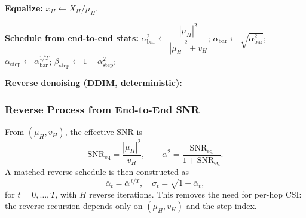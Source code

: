 \documentclass[journal]{IEEEtran}
\begin{document}
\begin{algorithm}[t]
\caption{AF--DDIM Detection}
\label{alg:af_ddim}

\textbf{Equalize:} $x_H \leftarrow X_H / \mu_H$.  

\textbf{Schedule from end-to-end stats:}
\;
$\alpha_{\mathrm{bar}}^2 \leftarrow \dfrac{|\mu_H|^2}{|\mu_H|^2 + v_H}$; \quad
$\alpha_{\mathrm{bar}} \leftarrow \sqrt{\alpha_{\mathrm{bar}}^2}$; \\
$\alpha_{\mathrm{step}} \leftarrow \alpha_{\mathrm{bar}}^{1/T}$; \quad
$\beta_{\mathrm{step}} \leftarrow 1 - \alpha_{\mathrm{step}}^2$; \\

\textbf{Reverse denoising (DDIM, deterministic):}\\
\end{algorithm}

\subsubsection{Reverse Process from End-to-End SNR}

From $(\mu_H,v_H)$, the effective SNR is
\[
\mathrm{SNR}_{\mathrm{eq}}=\frac{|\mu_H|^2}{v_H}, 
\qquad 
\bar\alpha^2=\frac{\mathrm{SNR}_{\mathrm{eq}}}{1+\mathrm{SNR}_{\mathrm{eq}}}.
\]
A matched reverse schedule is then constructed as
\[
\bar\alpha_t=\bar\alpha^{\,t/T},\quad
\sigma_t=\sqrt{1-\bar\alpha_t},
\]
for $t=0,\ldots,T$, with $H$ reverse iterations. 
This removes the need for per-hop CSI: the reverse recursion depends only 
on $(\mu_H,v_H)$ and the step index.
\end{document}
